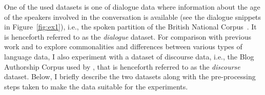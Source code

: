
        


One of the used datasets is one of dialogue data where information about the age of the speakers involved in the conversation is available (see the dialogue snippets in Figure~\ref{fig:ex1}), i.e., the spoken partition of the British National Corpus~\citep{love-spoken-bnc-2014}. It is henceforth referred to as the \emph{dialogue} dataset. For comparison with previous work
and to explore commonalities and differences between various types of language data,
I also experiment with a dataset of discourse data, i.e., the Blog Authorship Corpus used by \citet{schler2006effects}, that is henceforth referred to as the \emph{discourse} dataset.
Below, I briefly describe the two datasets along with the pre-processing steps taken to
make the data suitable for 
the experiments.

